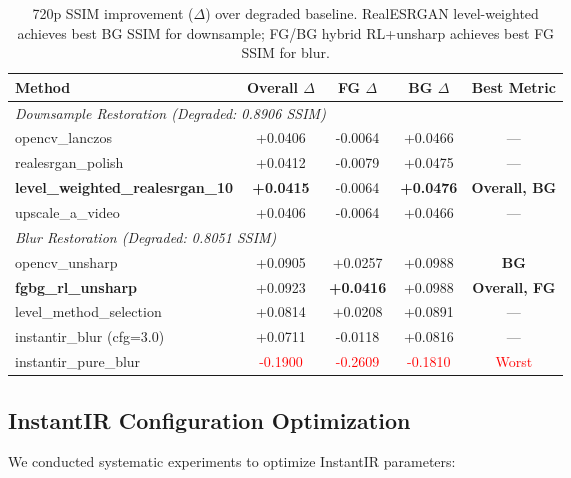 \documentclass[11pt,a4paper]{article}
\begin{document}
\begin{table}[h]
\centering
\begin{tabular}{lcccc}
\toprule
\textbf{Method} & \textbf{Overall $\Delta$} & \textbf{FG $\Delta$} & \textbf{BG $\Delta$} & \textbf{Best Metric} \\
\midrule
\multicolumn{5}{l}{\textit{Downsample Restoration (Degraded: 0.8906 SSIM)}} \\
\midrule
opencv\_lanczos & +0.0406 & -0.0064 & +0.0466 & --- \\
realesrgan\_polish & +0.0412 & -0.0079 & +0.0475 & --- \\
\textbf{level\_weighted\_realesrgan\_10} & \textbf{+0.0415} & -0.0064 & \textbf{+0.0476} & \textbf{Overall, BG} \\
upscale\_a\_video & +0.0406 & -0.0064 & +0.0466 & --- \\
\midrule
\multicolumn{5}{l}{\textit{Blur Restoration (Degraded: 0.8051 SSIM)}} \\
\midrule
opencv\_unsharp & +0.0905 & +0.0257 & +0.0988 & \textbf{BG} \\
\textbf{fgbg\_rl\_unsharp} & +0.0923 & \textbf{+0.0416} & +0.0988 & \textbf{Overall, FG} \\
level\_method\_selection & +0.0814 & +0.0208 & +0.0891 & --- \\
instantir\_blur (cfg=3.0) & +0.0711 & -0.0118 & +0.0816 & --- \\
instantir\_pure\_blur & \textcolor{red}{-0.1900} & \textcolor{red}{-0.2609} & \textcolor{red}{-0.1810} & \textcolor{red}{Worst} \\
\bottomrule
\end{tabular}
\caption{720p SSIM improvement ($\Delta$) over degraded baseline. RealESRGAN level-weighted achieves best BG SSIM for downsample; FG/BG hybrid RL+unsharp achieves best FG SSIM for blur.}
\label{tab:720p}
\end{table}

\subsection{InstantIR Configuration Optimization}

We conducted systematic experiments to optimize InstantIR parameters:
\end{document}
